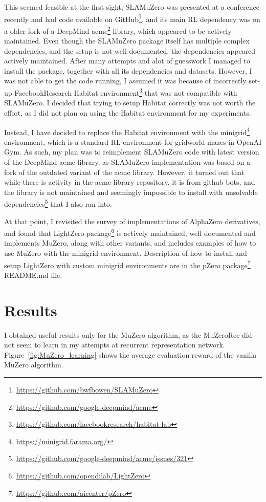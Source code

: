 \documentclass[12pt]{article}
\begin{document}
This seemed feasible at the first sight, SLAMuZero was presented at a conference recently and had code available on GitHub\footnote{\url{https://github.com/bwfbowen/SLAMuZero}}, and its main RL dependency was on a older fork of a DeepMind acme\footnote{\url{https://github.com/google-deepmind/acme}} library, which appeared to be actively maintained. Even though the SLAMuZero package itself has multiple complex dependencies, and the setup is not well documented, the dependencies appeared actively maintained. After many attempts and alot of guesswork I managed to install the package, together with all its dependencies and datasets. However, I was not able to get the code running, I assumed it was because of incorrectly set-up FacebookResearch Habitat environment\footnote{\url{https://github.com/facebookresearch/habitat-lab}} that was not compatible with SLAMuZero. I decided that trying to setup Habitat correctly was not worth the effort, as I did not plan on using the Habitat environment for my experiments.

Instead, I have decided to replace the Habitat environment with the minigrid\footnote{\url{https://minigrid.farama.org/}} environment, which is a standard RL environment for gridworld mazes in OpenAI Gym. As such, my plan was to reimplement SLAMuZero code with latest version of the DeepMind acme library, as SLAMuZero implementation was based on a fork of the outdated variant of the acme library. However, it turned out that while there is activity in the acme library repository, it is from github bots, and the library is not maintained and seemingly impossible to install with unsolvable dependencies\footnote{\url{https://github.com/google-deepmind/acme/issues/321}} that I also ran into.

At that point, I revisited the survey of implementations of AlphaZero derivatives, and found that LightZero package\footnote{\url{https://github.com/opendilab/LightZero}} is actively maintained, well documented and implements MuZero, along with other variants, and includes examples of how to use MuZero with the minigrid environment. Description of how to install and setup LightZero with custom minigrid environments are in the pZero package\footnote{\url{https://github.com/aicenter/pZero}} README.md file.

\section{Results}
I obtained useful results only for the MuZero algorithm, as the MuZeroRec did not seem to learn in my attempts at recurrent representation network. Figure~\ref{fig:MuZero_learning} shows the average evaluation reward of the vanilla MuZero algorithm. 
\end{document}
